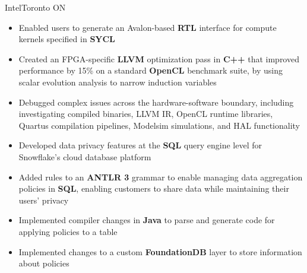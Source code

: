 \documentclass{moderncv}
\begin{document}
{Intel}{Toronto ON}{}
{\begin{itemize}
    \item Enabled users to generate an Avalon-based \textbf{RTL} interface for compute kernels specified in \textbf{SYCL}
    \item Created an FPGA-specific \textbf{LLVM} optimization pass in \textbf{C++} that improved performance by 15\% on a standard \textbf{OpenCL} benchmark suite, by using scalar evolution analysis to narrow induction variables
    \item Debugged complex issues across the hardware-software boundary, including investigating compiled binaries, LLVM IR, OpenCL runtime libraries, Quartus compilation pipelines, Modelsim simulations, and HAL functionality
\end{itemize}}

{\begin{itemize}
    \item Developed data privacy features at the \textbf{SQL} query engine level for Snowflake's cloud database platform
    \item Added rules to an \textbf{ANTLR 3} grammar to enable managing data aggregation policies in \textbf{SQL}, enabling customers to share data while maintaining their users' privacy
    \item Implemented compiler changes in \textbf{Java} to parse and generate code for applying policies to a table
    \item Implemented changes to a custom \textbf{FoundationDB} layer to store information about policies
\end{itemize}}

\begin{comment}
Snowflake1: Aggregation Policy Parser Stuff
basically, added a new type of policy which is an SQL object
it had to be added to the parser through an ANTLR grammar
but there was an issue with the way the grammar was factored into sub-grammars
so I had to inspect generated code and eventually refactor the root rules
into subrules in separate files
    rootparser.g:
        rule -> rule1 | rule2 | rule3;
    rules1.g:
        rule1 -> [...]
        rule2 -> [...]
    rules2.g:
        rule3 -> [...]
became
    rootparser.g:
        rule -> rules1 | rules2
    rules1.g:
        rules1 -> rule1 | rule2
        rule1 -> [...]
        rule2 -> [...]
    rules2.g:
        rule3 -> [...]
and then i was able to implement the rules for that type of policy
\end{comment}
\end{document}
